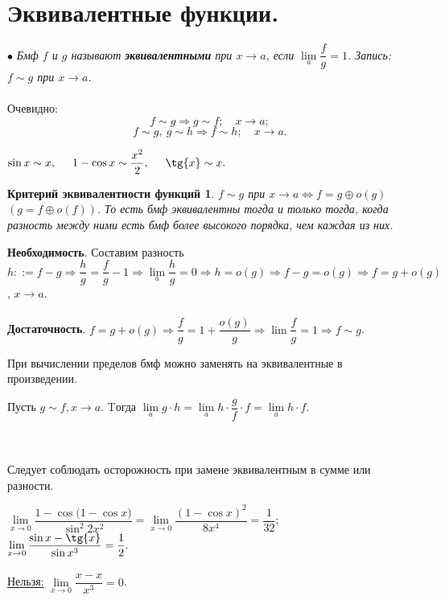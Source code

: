 \section{Эквивалентные функции.}
$\bullet$ \textit{Бмф $f$ и $g$ называют \textbf{эквивалентными} при $x \rightarrow a$, если $\lim\limits_{a} \dfrac{f}{g} = 1$. Запись: $f \sim g$ при $x \rightarrow a$.}\\\\
Очевидно: $$f \sim g \Rightarrow g \sim f; \quad x \rightarrow a;$$
$$f \sim g,\ g \sim h \Rightarrow f \sim h; \quad x \rightarrow a.$$
\begin{example}
	$\sin{x} \sim x, \hspace{0.5 cm} 1 - \cos{x} \sim \dfrac{x^2}{2}, \hspace{0.5 cm} \tg{x} \sim x.$
\end{example}
\newtheorem*{keq}{Критерий эквивалентности функций}
\begin{keq} 
	$f \sim g$ при $x \rightarrow a \Longleftrightarrow f = g \oplus o(g)$ $(g = f \oplus o(f)).$ То есть бмф эквивалентны тогда и только тогда, когда разность между ними есть бмф более высокого порядка, чем каждая из них.
\end{keq}
\begin{Proof}
	\textbf{Необходимость}. Составим разность $h ::= f - g \Rightarrow \dfrac{h}{g} = \dfrac{f}{g} - 1 \Rightarrow \lim\limits_{a} \dfrac{h}{g} = 0 \Rightarrow h = o(g) \Rightarrow f - g = o(g) \Rightarrow f = g + o(g)$, $x \rightarrow a$.\\\\
	\textbf{Достаточность}. $f = g + o(g) \Rightarrow \dfrac{f}{g} = 1 + \dfrac{o(g)}{g} \Rightarrow \lim\dfrac{f}{g} = 1 \Rightarrow f \sim g$.
\end{Proof}
\begin{theorem}
	При вычислении пределов бмф можно заменять на эквивалентные в произведении.
\end{theorem}
\begin{Proof}
	Пусть $g \sim f, x \rightarrow a$. Tогда $\lim\limits_{a}g\cdot h = \lim\limits_{a}h \cdot \dfrac{g}{f}\cdot f = \lim\limits_{a}h\cdot f$.
\end{Proof}\\\\
Следует соблюдать осторожность при замене эквивалентным в сумме или разности.\\
\begin{example}
	$\lim\limits_{x \rightarrow 0} \dfrac{1 - \cos{(1 - \cos{x}})}{\sin^2{2x^2}} = \lim\limits_{x \rightarrow 0} \dfrac{(1 - \cos{x})^2}{8 x^4} = \dfrac{1}{32};$\\
	$\lim\limits_{x \rightarrow 0} \dfrac{\sin{x} - \tg{x}}{\sin{x^3}} = \dfrac{1}{2}.$\\\\
	\underline{Нельзя:} $\lim\limits_{x \rightarrow 0} \dfrac{x - x}{x^3} = 0$.
\end{example}
